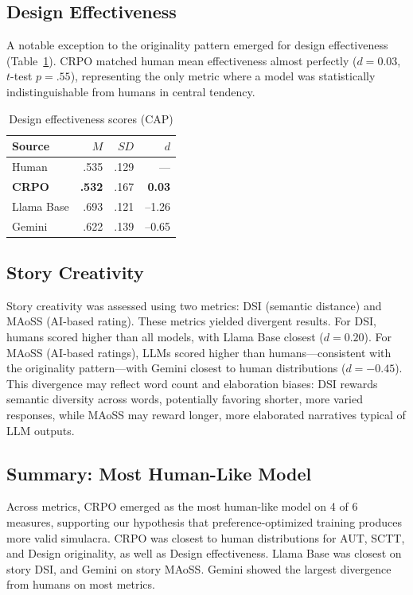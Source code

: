 \documentclass[11pt,twocolumn]{article}
\begin{document}
\subsection{Design Effectiveness}

A notable exception to the originality pattern emerged for design effectiveness (Table~\ref{tab:effectiveness}). CRPO matched human mean effectiveness almost perfectly ($d = 0.03$, $t$-test $p = .55$), representing the only metric where a model was statistically indistinguishable from humans in central tendency.

\begin{table}[h]
\centering
\caption{Design effectiveness scores (CAP)}
\label{tab:effectiveness}
\begin{tabular}{lrrr}
\toprule
Source & $M$ & $SD$ & $d$ \\
\midrule
Human & .535 & .129 & --- \\
\textbf{CRPO} & \textbf{.532} & .167 & \textbf{0.03} \\
Llama Base & .693 & .121 & --1.26 \\
Gemini & .622 & .139 & --0.65 \\
\bottomrule
\end{tabular}
\end{table}

\subsection{Story Creativity}

Story creativity was assessed using two metrics: DSI (semantic distance) and MAoSS (AI-based rating). These metrics yielded divergent results. For DSI, humans scored higher than all models, with Llama Base closest ($d = 0.20$). For MAoSS (AI-based ratings), LLMs scored higher than humans---consistent with the originality pattern---with Gemini closest to human distributions ($d = -0.45$). This divergence may reflect word count and elaboration biases: DSI rewards semantic diversity across words, potentially favoring shorter, more varied responses, while MAoSS may reward longer, more elaborated narratives typical of LLM outputs.

\subsection{Summary: Most Human-Like Model}

Across metrics, CRPO emerged as the most human-like model on 4 of 6 measures, supporting our hypothesis that preference-optimized training produces more valid simulacra. CRPO was closest to human distributions for AUT, SCTT, and Design originality, as well as Design effectiveness. Llama Base was closest on story DSI, and Gemini on story MAoSS. Gemini showed the largest divergence from humans on most metrics.
\end{document}
